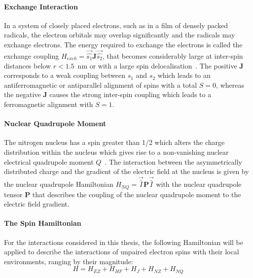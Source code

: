 \paragraph*{Exchange Interaction}
In a system of closely placed electrons, such as in a film of densely packed radicals, the electron orbitals may overlap significantly and the radicals may exchange electrons. The energy required to exchange the electrons is called the exchange coupling $H_{exch} = \vec{\hat{s_1}}\textbf{J}\vec{\hat{s_2}}$, that becomes considerably large at inter-spin distances below $r<1.5$~nm or with a large spin delocalisation~\cite{Schweiger2001_exch}. The positive $\textbf{J}$ corresponds to a weak coupling between $s_1$ and $s_2$ which leads to an antiferromagnetic or antiparallel alignment of spins with a total $S=0$, whereas the negative $\textbf{J}$ causes the strong inter-spin coupling which leads to a ferromagnetic alignment with $S=1$.


\paragraph*{Nuclear Quadrupole Moment}
The nitrogen nucleus has a spin greater than 1/2 which alters the charge distribution within the nucleus which gives rise to a non-vanishing nuclear electrical quadrupole moment $Q$~\cite{Schweiger2001_exch}. The interaction between the asymmetrically distributed charge and the gradient of the electric field at the nucleus is given by the nuclear quadrupole Hamiltonian $H_{NQ}=\vec{\hat{I}}\textbf{P}\vec{\hat{I}}$ with the nuclear quadrupole tensor $\textbf{P}$ that describes the coupling of the nuclear quadrupole moment to the electric field gradient.

\paragraph*{The Spin Hamiltonian}
For the interactions considered in this thesis, the following Hamiltonian will be applied to describe the interactions of unpaired electron spins with their local environments, ranging by their magnitude:
\begin{equation}
H = H_{EZ} + H_{HF} + H_{J} + H_{NZ} + H_{NQ}
\end{equation}

